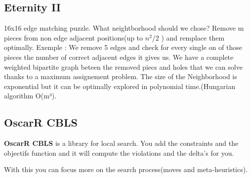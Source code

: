 \subsection{Eternity II}
16x16 edge matching puzzle.\newline
What neightborhood should we chose?\newline
Remove m pieces from non edge adjacent positions(up to $n^2/2$ ) and remplace them optimally. \newline
Exemple : We remove 5 edges and check for every single on of those pieces the number of correct adjacent edges it gives us. We have a complete weighted bipartite graph beteen the removed piecs and holes that we can solve thanks to a maximum assignement problem.
The size of the Neighborhood is exponential but it can be optimally explored in polynomial time.(Hungarian algorithm O(m³).


















\subsection{OscarR CBLS}
\textbf{OscarR CBLS} is a library for local search.
You add the constraints and the objectifs function and it will compute the violations and the delta's for you.

With this you can focus more on the search process(moves and meta-heuristics).
